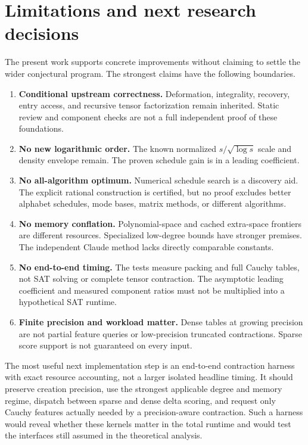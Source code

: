 \documentclass[11pt,letterpaper]{article}
\theoremstyle{remark}\newtheorem{remark}[theorem]{Remark}
\begin{document}
\section{Limitations and next research decisions}
The present work supports concrete improvements without claiming to settle the wider conjectural program. The strongest claims have the following boundaries.
\begin{enumerate}
\item \textbf{Conditional upstream correctness.} Deformation, integrality, recovery, entry access, and recursive tensor factorization remain inherited. Static review and component checks are not a full independent proof of these foundations.
\item \textbf{No new logarithmic order.} The known normalized $s/\sqrt{\log s}$ scale and density envelope remain. The proven schedule gain is in a leading coefficient.
\item \textbf{No all-algorithm optimum.} Numerical schedule search is a discovery aid. The explicit rational construction is certified, but no proof excludes better alphabet schedules, mode bases, matrix methods, or different algorithms.
\item \textbf{No memory conflation.} Polynomial-space and cached extra-space frontiers are different resources. Specialized low-degree bounds have stronger premises. The independent Claude method lacks directly comparable constants.
\item \textbf{No end-to-end timing.} The tests measure packing and full Cauchy tables, not SAT solving or complete tensor contraction. The asymptotic leading coefficient and measured component ratios must not be multiplied into a hypothetical SAT runtime.
\item \textbf{Finite precision and workload matter.} Dense tables at growing precision are not partial feature queries or low-precision truncated contractions. Sparse score support is not guaranteed on every input.
\end{enumerate}
The most useful next implementation step is an end-to-end contraction harness with exact resource accounting, not a larger isolated headline timing. It should preserve creation precision, use the strongest applicable degree and memory regime, dispatch between sparse and dense delta scoring, and request only Cauchy features actually needed by a precision-aware contraction. Such a harness would reveal whether these kernels matter in the total runtime and would test the interfaces still assumed in the theoretical analysis.
\end{document}
